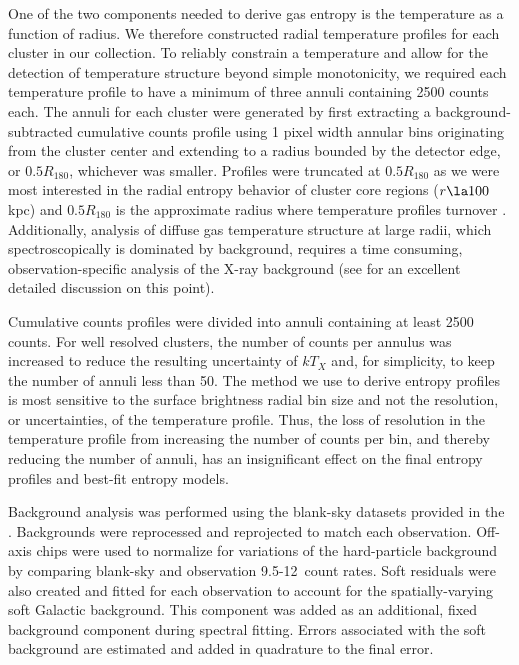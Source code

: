 \documentclass{emulateapj}
\begin{document}
One of the two components needed to derive gas entropy is the
temperature as a function of radius. We therefore constructed radial
temperature profiles for each cluster in our collection. To reliably
constrain a temperature and allow for the detection of temperature
structure beyond simple monotonicity, we required each temperature
profile to have a minimum of three annuli containing 2500 counts
each. The annuli for each cluster were generated by first extracting a
background-subtracted cumulative counts profile using 1 pixel width
annular bins originating from the cluster center and extending to a
radius bounded by the detector edge, or $0.5 R_{180}$, whichever was
smaller. Profiles were truncated at $0.5 R_{180}$ as we were most
interested in the radial entropy behavior of cluster core regions ($r
\la 100$ kpc) and $0.5 R_{180}$ is the approximate radius where
temperature profiles turnover
\citep{2005ApJ...628..655V}. Additionally, analysis of diffuse gas
temperature structure at large radii, which spectroscopically is
dominated by background, requires a time consuming,
observation-specific analysis of the X-ray background (see
\citealt{minggroups} for an excellent detailed discussion on this
point).

Cumulative counts profiles were divided into annuli containing at
least 2500 counts. For well resolved clusters, the number of counts
per annulus was increased to reduce the resulting uncertainty of
$kT_X$ and, for simplicity, to keep the number of annuli less than
50. The method we use to derive entropy profiles is most sensitive to
the surface brightness radial bin size and not the resolution, or
uncertainties, of the temperature profile. Thus, the loss of
resolution in the temperature profile from increasing the number of
counts per bin, and thereby reducing the number of annuli, has an
insignificant effect on the final entropy profiles and best-fit
entropy models.

Background analysis was performed using the blank-sky datasets
provided in the \caldb. Backgrounds were reprocessed and reprojected
to match each observation. Off-axis chips were used to normalize for
variations of the hard-particle background by comparing blank-sky and
observation 9.5-12\keV\ count rates. Soft residuals were also created
and fitted for each observation to account for the spatially-varying
soft Galactic background. This component was added as an additional,
fixed background component during spectral fitting. Errors associated
with the soft background are estimated and added in quadrature to the
final error.
\end{document}
